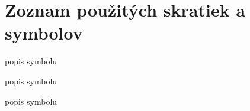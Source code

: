 ﻿\chapter{Zoznam použitých skratiek a symbolov}
\symbolsize=3.5cm%

\begin{symboly}
\item[$\Phi$] popis symbolu

\item[dlouhý symbol] popis symbolu

\item[ještě delší dlouhý symbol] popis symbolu
\end{symboly}
